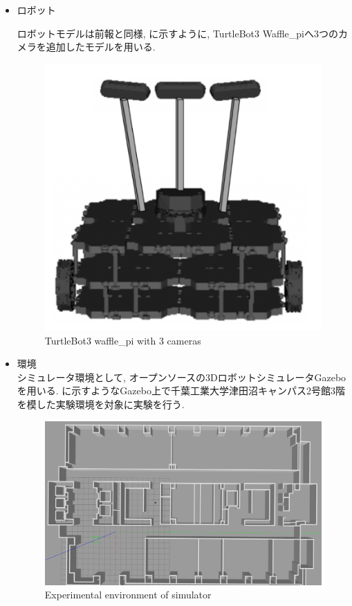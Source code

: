 \begin{itemize}
  \item ロボット

ロボットモデルは前報\cite{okada1}\cite{okada2}と同様, に示すように, TurtleBot3 Waffle\_pi\cite{turtlebot3}へ3つのカメラを追加したモデルを用いる.

\begin{figure}[hbtp]
  \centering
 \includegraphics[keepaspectratio, scale=0.22]
      {images/Waffle_pi.png}
 \caption{TurtleBot3 waffle\_pi with 3 cameras}
 \label{Fig:waffle_pi}
\end{figure}

\item 環境\\
シミュレータ環境として, オープンソースの3DロボットシミュレータGazebo\cite{gazebo}を用いる. に示すようなGazebo上で千葉工業大学津田沼キャンパス2号館3階を模した実験環境を対象に実験を行う.

\begin{figure}[hbtp]
  \centering
 \includegraphics[keepaspectratio, scale=0.12]
      {images/tsudanuma2-3_simorg.png}
 \caption{Experimental environment of simulator}
 \label{Fig:sim}
\end{figure}

\end{itemize}

